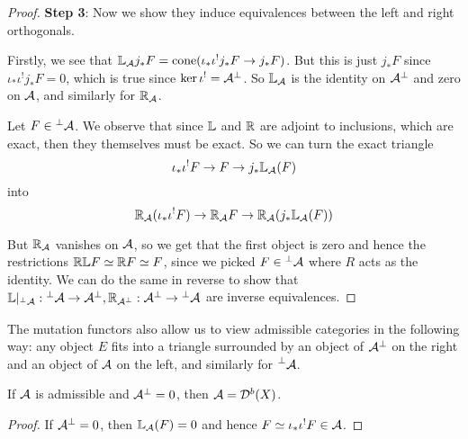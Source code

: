 \begin{proof}
    \textbf{Step 3}: Now we show they induce equivalences between the left and right orthogonals.

    Firstly, we see that $\mathbb{L}_{\mathcal{A}} j_* F = \mathrm{cone}(\iota_* \iota^! j_* F \rightarrow j_* F)$. But this is just $j_* F$ since $\iota_* \iota^! j_* F=0$, which is true since $\ker \iota^! = \mathcal{A}^\perp $. So $\mathbb{L}_{\mathcal{A}}$ is the identity on $\mathcal{A}^\perp$ and zero on $\mathcal{A}$, and similarly for $\mathbb{R}_{\mathcal{A}}$. 

    Let $F\in \prescript{\perp}{}{}\mathcal{A}$. We observe that since $\mathbb{L}$ and $\mathbb{R}$ are adjoint to inclusions, which are exact, then they themselves must be exact. So we can turn the exact triangle $$\iota_* \iota^! F \rightarrow F \rightarrow j_*\mathbb{L}_{\mathcal{A}}(F)$$
    into $$\mathbb{R}_{\mathcal{A}}(\iota_* \iota^! F) \rightarrow \mathbb{R}_{\mathcal{A}} F \rightarrow \mathbb{R}_{\mathcal{A}} (j_*\mathbb{L}_{\mathcal{A}}(F))$$

    But $\mathbb{R}_{\mathcal{A}}$ vanishes on $\mathcal{A}$, so we get that the first object is zero and hence the restrictions $\mathbb{R} \mathbb{L} F \simeq \mathbb{R} F\simeq F$, since we picked $F\in \prescript{\perp}{}{}\mathcal{A}$ where $R$ acts as the identity. We can do the same in reverse to show that $\mathbb{L}|_{\prescript{\perp}{}{}\mathcal{A}}: \prescript{\perp}{}{}\mathcal{A} \rightarrow \mathcal{A}^\perp, \mathbb{R}_{\mathcal{A}^\perp}: \mathcal{A}^\perp \rightarrow \prescript{\perp}{}{}\mathcal{A}$ are inverse equivalences.


\end{proof}

The mutation functors also allow us to view admissible categories in the following way: any object $E$ fits into a triangle surrounded by an object of $\mathcal{A}^\perp$ on the right and an object of $\mathcal{A}$ on the left, and similarly for $\prescript{\perp}{}{\mathcal{A}}$. 

\begin{corollary}{}{}
    If $\mathcal{A}$ is admissible and $\mathcal{A}^\perp=0$, then $\mathcal{A}=\mathcal{D}^b(X)$.
\end{corollary}

\begin{proof}
    If $\mathcal{A}^\perp=0$, then $\mathbb{L}_{\mathcal{A}}(F)=0$ and hence $F\simeq \iota_* \iota^! F\in \mathcal{A}$.
\end{proof}

